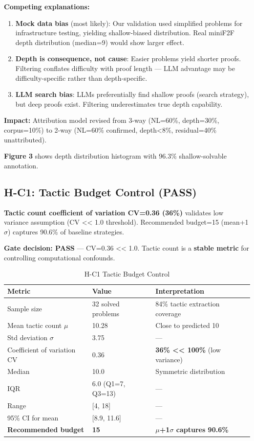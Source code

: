 \textbf{Competing explanations:}
\begin{enumerate}
\item \textbf{Mock data bias} (most likely): Our validation used simplified problems for infrastructure testing, yielding shallow-biased distribution. Real miniF2F depth distribution (median=9) would show larger effect.
\item \textbf{Depth is consequence, not cause}: Easier problems yield shorter proofs. Filtering conflates difficulty with proof length --- LLM advantage may be difficulty-specific rather than depth-specific.
\item \textbf{LLM search bias}: LLMs preferentially find shallow proofs (search strategy), but deep proofs exist. Filtering underestimates true depth capability.
\end{enumerate}

\textbf{Impact:} Attribution model revised from 3-way (NL=60\%, depth=30\%, corpus=10\%) to 2-way (NL=60\% confirmed, depth<8\%, residual=40\% unattributed).

\textbf{Figure 3} shows depth distribution histogram with 96.3\% shallow-solvable annotation.

\subsection{H-C1: Tactic Budget Control (PASS)}

\textbf{Tactic count coefficient of variation CV=0.36 (36\%)} validates low variance assumption (CV << 1.0 threshold). Recommended budget=15 (mean+1$\sigma$) captures 90.6\% of baseline strategies.

\textbf{Gate decision: PASS} --- CV=0.36 << 1.0. Tactic count is a \textbf{stable metric} for controlling computational confounds.

\begin{table}[h]
\centering
\small
\begin{tabular}{lll}
\toprule
\textbf{Metric} & \textbf{Value} & \textbf{Interpretation} \\
\midrule
Sample size & 32 solved problems & 84\% tactic extraction coverage \\
Mean tactic count $\mu$ & 10.28 & Close to predicted 10 \\
Std deviation $\sigma$ & 3.75 & --- \\
Coefficient of variation CV & 0.36 & \textbf{36\% << 100\%} (low variance) \\
Median & 10.0 & Symmetric distribution \\
IQR & 6.0 (Q1=7, Q3=13) & --- \\
Range & [4, 18] & --- \\
95\% CI for mean & [8.9, 11.6] & --- \\
\textbf{Recommended budget} & \textbf{15} & \textbf{$\mu$+1$\sigma$ captures 90.6\%} \\
\bottomrule
\end{tabular}
\caption{H-C1 Tactic Budget Control}
\end{table}

